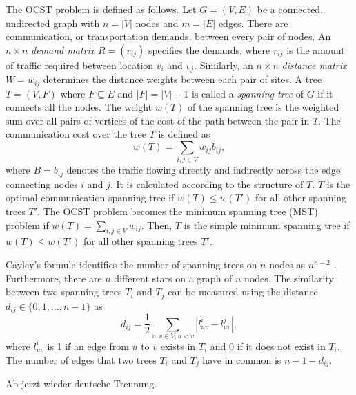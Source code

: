 The OCST problem is defined as follows. Let $G=(V,E)$ be a connected, undirected graph with $n=|V|$ nodes and $m=|E|$ edges. There are  communication, or transportation demands, between every pair of nodes.  An $n \times n$ {\em demand matrix} $R=(r_{ij})$ specifies the demands, where $r_{ij}$ is the amount of traffic required between location $v_i$ and $v_j$. Similarly, an $n\times n$ {\em distance matrix} $W=w_{ij}$ determines the distance weights between each pair of sites. 
A tree $T=(V,F)$ where $F \subseteq E$ and $|F|=|V|-1$ is called a {\em spanning tree} of $G$ if it connects all the nodes. The weight $w(T)$ of the spanning tree is the weighted sum over all pairs of vertices of the cost of the path between the pair in $T$. The communication cost over the tree $T$ is defined as 
\begin{equation}
  \label{equ:1}
w(T)=\sum_{i,j\in V}w_{ij}b_{ij},
\end{equation}
where $B=b_{ij}$ denotes the traffic flowing directly and indirectly across the edge connecting nodes $i$ and $j$. It is calculated according to the structure of $T$. 
$T$ is the optimal communication spanning tree if $w(T)\leq w(T')$ for all other spanning trees $T'$. %
The OCST problem becomes the minimum spanning tree (MST) problem if $w(T)=\sum_{i,j\in V}w_{ij}$. Then, $T$ is the simple minimum spanning tree if $w(T)\leq w(T')$  for all other spanning trees $T'$.%

Cayley's formula identifies the number of spanning trees on $n$ nodes as $n^{n-2}$ . Furthermore, there are $n$ different stars on a graph of $n$ nodes. The similarity between two spanning trees $T_i$ and $T_j$ can be measured using the distance   $d_{ij}\in\{0,1,\ldots,n-1\}$ as 
$$
d_{ij}=\frac{1}{2}\sum_{u,v\in V,u<v}|l^{i}_{uv}-l^{j}_{uv}|,
$$
where $l^{i}_{uv}$ is 1 if an edge from $u$ to $v$ exists in $T_i$ and 0 if it does not exist in $T_i$. The number of edges that two trees $T_i$ and $T_j$ have in common is $n-1-d_{ij}$.





Ab jetzt wieder deutsche Trennung.

